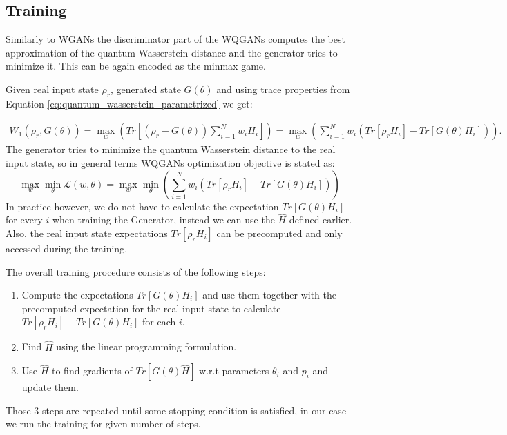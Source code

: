 \subsection{Training}
Similarly to WGANs the discriminator part of the WQGANs computes the best
approximation of the quantum Wasserstein distance and the generator tries to
minimize it. This can be again encoded as the minmax game.

Given real input state $\rho_r$, generated state $G(\theta)$ and using trace
properties from Equation \ref{eq:quantum_wasserstein_parametrized} we get:

\begin{equation}
  \label{eq:quantum_wasserstein_separated_trace}
  \begin{split}
    W_1(\rho_r, G(\theta)) = \max_{w}{(Tr[(\rho_r - G(\theta))\sum_{i=1}^N w_iH_i])} = \max_{w}{(\sum_{i=1}^Nw_i(Tr[\rho_rH_i] - Tr[G(\theta)H_i]))}.
  \end{split}
\end{equation}
The generator tries to minimize the quantum Wasserstein distance to the real
input state, so in general terms WQGANs optimization objective is stated as:
\begin{equation}
  \max_{w}{\min_{\theta}{\mathcal{L}(w, \theta)}} = \max_{w}{\min_{\theta}{(\sum_{i=1}^Nw_i(Tr[\rho_rH_i] - Tr[G(\theta)H_i]))}} 
\end{equation}
In practice however, we do not have to calculate the expectation $Tr[G(\theta)H_i]$ for
every $i$ when training the Generator, instead we can use the $\hat{H}$ defined
earlier. Also, the real input state expectations $Tr[\rho_rH_i]$ can be
precomputed and only accessed during the training.

The overall training procedure consists of the following steps:
\begin{enumerate}
\item Compute the expectations $Tr[G(\theta)H_i]$ and use them together with
  the precomputed expectation for the real input state to calculate $Tr[\rho_rH_i] -
  Tr[G(\theta)H_i]$ for each $i$.
\item Find $\hat{H}$ using the linear programming formulation.
\item Use $\hat{H}$ to find gradients of $Tr[G(\theta)\hat{H}]$ w.r.t parameters
  $\theta_i$ and $p_i$ and update them.
\end{enumerate}

Those 3 steps are repeated until some stopping condition is satisfied, in our
case we run the training for given number of steps.

